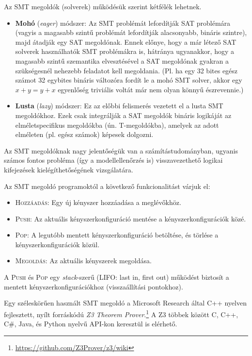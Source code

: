Az SMT megoldók (solverek) működésük szerint kétfélék lehetnek.
\begin{itemize}
    \item \textbf{Mohó} (\emph{eager}) módszer: Az SMT problémát lefordítják SAT problémára (vagyis a magasabb szintű problémát lefordítják alacsonyabb, bináris szintre), majd átadják egy SAT megoldónak. Ennek előnye, hogy a már létező SAT solverek használhatók SMT problémákra is, hátránya ugyanakkor, hogy a magasabb szintű szemantika elvesztésével a SAT megoldónak gyakran a szükségesnél nehezebb feladatot kell megoldania. (Pl. ha egy 32 bites egész számot 32 egybites bináris változóra fordít le a mohó SMT solver, akkor egy $x+y = y+x$ egyenlőség triviális voltát már nem olyan könnyű észrevennie.)
    \item \textbf{Lusta} (\emph{lazy}) módszer: Ez az előbbi felismerés vezetett el a lusta SMT megoldókhoz. Ezek csak integrálják a SAT megoldók bináris logikáját az elméletspecifikus megoldókba (ún. T-megoldókba), amelyek az adott elméleten (pl. egész számok) képesek dolgozni.
\end{itemize}

Az SMT megoldóknak nagy jelentőségük van a számítástudományban, ugyanis számos fontos probléma (így a modellellenőrzés is) visszavezethető logikai kifejezések kielégíthetőségének vizsgálatára.

Az SMT megoldó programoktól a következő funkcionalitást várjuk el:
\begin{itemize}
    \item \textsc{Hozzáadás}: Egy új kényszer hozzáadása a meglévőkhöz.
    \item \textsc{Push}: Az aktuális kényszerkonfiguráció mentése a kényszerkonfigurációk közé.
    \item \textsc{Pop}: A legutóbb mentett kényszerkonfiguráció betöltése, és törlése a kényszerkonfigurációk közül.
    \item \textsc{Megoldás}: Az aktuális kényszerek megoldása.
\end{itemize}

A \textsc{Push} és \textsc{Pop} egy \emph{stack}-szerű (LIFO: last in, first out) működést biztosít a mentett kényszerkonfigurációkhoz (visszaállítási pontokhoz).

Egy széleskörűen használt SMT megoldó a Microsoft Research által C++ nyelven fejlesztett, nyílt forráskódú \emph{Z3 Theorem Prover}.\footnote{\url{https://github.com/Z3Prover/z3/wiki}} A Z3 többek között C, C++, C\#, Java, és Python nyelvű API-kon keresztül is elérhető.

